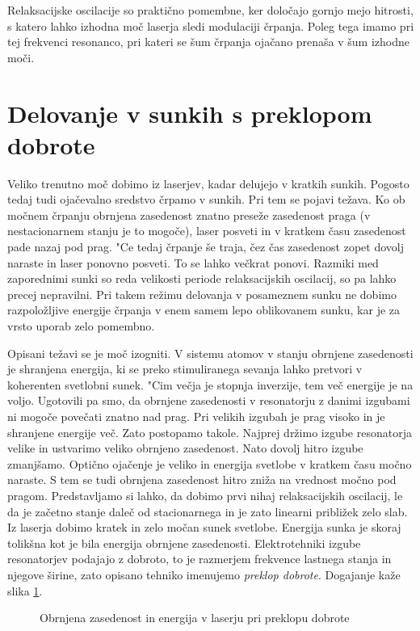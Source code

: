Relaksacijske oscilacije so praktično pomembne, ker določajo gornjo mejo
hitrosti, s katero lahko izhodna moč laserja sledi modulaciji črpanja.
Poleg tega imamo pri tej frekvenci resonanco, pri kateri se šum črpanja
ojačano prenaša v šum izhodne moči.

\section{Delovanje v sunkih s preklopom dobrote}

Veliko trenutno moč dobimo iz laserjev, kadar delujejo v kratkih sunkih.
Pogosto tedaj tudi ojačevalno sredstvo črpamo v sunkih. Pri tem se
pojavi težava. Ko ob močnem črpanju obrnjena zasedenost znatno
preseže zasedenost praga (v nestacionarnem stanju je to mogoče), laser
posveti in v kratkem času zasedenost pade nazaj pod prag. "Ce tedaj
črpanje še traja, čez čas zasedenost zopet dovolj naraste in laser
ponovno posveti. To se lahko večkrat ponovi. Razmiki med zaporednimi sunki
so reda velikosti periode relaksacijskih oscilacij, so pa lahko precej
nepravilni. Pri takem režimu delovanja v posameznem sunku ne dobimo
razpoložljive energije črpanja v enem samem lepo oblikovanem sunku, kar
je za vrsto uporab zelo pomembno.

Opisani težavi se je moč izogniti. V sistemu atomov v stanju obrnjene
zasedenosti je shranjena energija, ki se preko stimuliranega sevanja lahko
pretvori v koherenten svetlobni sunek. "Cim večja je stopnja inverzije, tem
več energije je na voljo. Ugotovili pa smo, da obrnjene zasedenosti v
resonatorju z danimi izgubami ni mogoče povečati znatno nad prag. Pri
velikih izgubah je prag visoko in je shranjene energije več. Zato postopamo
takole. Najprej držimo izgube resonatorja velike in ustvarimo veliko
obrnjeno zasedenost. Nato dovolj hitro izgube zmanjšamo. Optično ojačenje
je veliko in energija svetlobe v kratkem času močno naraste. S tem se tudi
obrnjena zasedenost hitro zniža na vrednost močno pod pragom.
Predstavljamo si lahko, da dobimo prvi nihaj relaksacijskih oscilacij, le da
je začetno stanje daleč od stacionarnega in je zato linearni približek
zelo slab. Iz laserja dobimo kratek in zelo močan sunek svetlobe. Energija
sunka je skoraj tolikšna kot je bila energija obrnjene zasedenosti.
Elektrotehniki izgube resonatorjev podajajo z dobroto, to je razmerjem
frekvence lastnega stanja in njegove širine, zato opisano tehniko imenujemo 
{\it preklop dobrote}. Dogajanje kaže slika \ref{s5.9}.

\begin{figure}[tbp]
\label{s5.9} \vskip 10cm
\caption{Obrnjena zasedenost in energija v laserju pri preklopu dobrote}
\end{figure}

